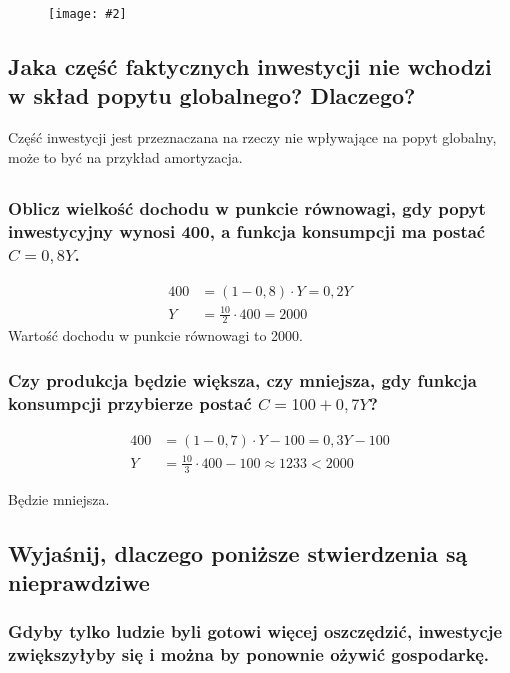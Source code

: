 \documentclass[a4paper,12pt]{article}
\newcommand{\obrazek}[2]{
	\begin{figure}[h]
		\centering
		\texttt{[image: \#2]}
	\end{figure}
}
\begin{document}
\obrazek{0.3}{Inwestycje1.png}

\subsection{Jaka część faktycznych inwestycji nie wchodzi w skład popytu globalnego? Dlaczego?}

Część inwestycji jest przeznaczana na rzeczy nie wpływające na popyt globalny, może to być na przykład amortyzacja.

\subsection{}

\subsubsection{Oblicz wielkość dochodu w punkcie równowagi, gdy popyt inwestycyjny wynosi 400, a funkcja konsumpcji ma postać $C = 0,8Y$.}

\begin{align*}
	400 & = \left(1 - 0,8\right)\cdot Y = 0,2Y \\
	Y   & = \frac{10}{2} \cdot 400 = 2000
\end{align*}
Wartość dochodu w punkcie równowagi to 2000.

\subsubsection{Czy produkcja będzie większa, czy mniejsza, gdy funkcja konsumpcji przybierze postać $C = 100 + 0,7Y$?}

\begin{align*}
	400 & = \left(1 - 0,7\right)\cdot Y - 100 = 0,3Y - 100   \\
	Y   & = \frac{10}{3} \cdot 400 - 100 \approx 1233 < 2000
\end{align*}

Będzie mniejsza.

\subsection{Wyjaśnij, dlaczego poniższe stwierdzenia są nieprawdziwe}

\subsubsection*{Gdyby tylko ludzie byli gotowi więcej oszczędzić, inwestycje zwiększyłyby się i można by ponownie ożywić gospodarkę.}
\end{document}
